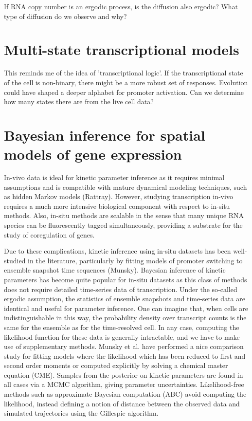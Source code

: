 \documentclass{article}
\begin{document}
If RNA copy number is an ergodic process, is the diffusion also ergodic? What type of diffusion do we observe and why? 

\section{Multi-state transcriptional models}

This reminds me of the idea of 'transcriptional logic'. If the transcriptional state of the cell is non-binary, there might be a more robust set of responses. Evolution could have shaped a deeper alphabet for promoter activation. Can we determine how many states there are from the live cell data?

\section{Bayesian inference for spatial models of gene expression}

In-vivo data is ideal for kinetic parameter inference as it requires minimal assumptions and is compatible with mature dynamical modeling techniques, such as hidden Markov models (Rattray). However, studying transcription in-vivo requires a much more intensive biological component with respect to in-situ methods. Also, in-situ methods are scalable in the sense that many unique RNA species can be fluorescently tagged simultaneously, providing a substrate for the study of coregulation of genes.

Due to these complications, kinetic inference using  in-situ datasets has been well-studied in the literature, particularly by fitting models of promoter switching to ensemble snapshot time sequences (Munsky). Bayesian inference of kinetic parameters has become quite popular for in-situ datasets as this class of methods does not require detailed time-series data of transcription. Under the so-called ergodic assumption, the statistics of ensemble snapshots and time-series data are identical and useful for parameter inference. One can imagine that, when cells are indistinguishable in this way, the probability density over transcript counts is the same for the ensemble as for the time-resolved cell. In any case, computing the likelihood function for these data is generally intractable, and we have to make use of supplementary methods. Munsky et al. have performed a nice comparison study for fitting models where the likelihood which has been reduced to first and second order moments or computed explicitly by solving a chemical master equation (CME). Samples from the posterior on kinetic parameters are found in all cases via a MCMC algorithm, giving parameter uncertainties. Likelihood-free methods such as approximate Bayesian computation (ABC) avoid computing the likelihood, instead defining a notion of distance between the observed data and simulated trajectories using the Gillespie algorithm.
\end{document}
